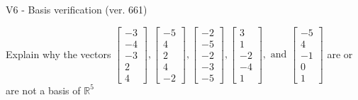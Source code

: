 \begin{exercise}
  \begin{exerciseTitle}V6 - Basis verification (ver. 661)\end{exerciseTitle}
  \begin{exerciseStatement}
    Explain why the vectors \(\left[\begin{array}{r}
-3 \\
-4 \\
-3 \\
2 \\
4
\end{array}\right] , \left[\begin{array}{r}
-5 \\
4 \\
2 \\
4 \\
-2
\end{array}\right] , \left[\begin{array}{r}
-2 \\
-5 \\
-2 \\
-3 \\
-5
\end{array}\right] , \left[\begin{array}{r}
3 \\
1 \\
-2 \\
-4 \\
1
\end{array}\right] , \text{ and } \left[\begin{array}{r}
-5 \\
4 \\
-1 \\
0 \\
1
\end{array}\right]\) are or are not a basis of \(\mathbb{R}^5\)	



\end{exerciseStatement}
\end{exercise}
